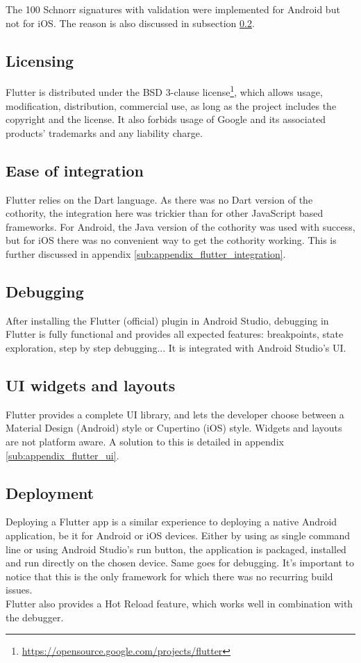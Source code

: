 \documentclass[11pt, a4paper, twoside, openright]{article} %
\begin{document}
{The 100 Schnorr signatures with validation were implemented for Android but not for iOS. The reason is also discussed in subsection \ref{sub:flutter_ease_integration}.

\subsection{Licensing}
Flutter is distributed under the BSD 3-clause  license\footnote{\url{https://opensource.google.com/projects/flutter}}, which allows usage, modification, distribution, commercial use, as long as the project includes the copyright and the license. It also forbids usage of Google and its associated products' trademarks and any liability charge.

\subsection{Ease of integration}
\label{sub:flutter_ease_integration}
Flutter relies on the Dart language. As there was no Dart version of the cothority, the integration here was trickier than for other JavaScript based frameworks. For Android, the Java version of the cothority was used with success, but for iOS there was no convenient way to get the cothority working. This is further discussed in appendix \ref{sub:appendix_flutter_integration}.

\subsection{Debugging}
After installing the Flutter (official) plugin in Android Studio, debugging in Flutter is fully functional and provides all expected features: breakpoints, state exploration, step by step debugging... It is integrated with Android Studio's UI.

\subsection{UI widgets and layouts}
Flutter provides a complete UI library, and lets the developer choose between a Material Design (Android) style or Cupertino (iOS) style. Widgets and layouts are not platform aware. A solution to this is detailed in appendix \ref{sub:appendix_flutter_ui}.

\subsection{Deployment}
Deploying a Flutter app is a similar experience to deploying a native Android application, be it for Android or iOS devices. Either by using as single command line or using Android Studio's run button, the application is packaged, installed and run directly on the chosen device. Same goes for debugging. It's important to notice that this is the only framework for which there was no recurring build issues.\\ 
Flutter also provides a Hot Reload feature, which works well in combination with the debugger.\\

}
\end{document}
